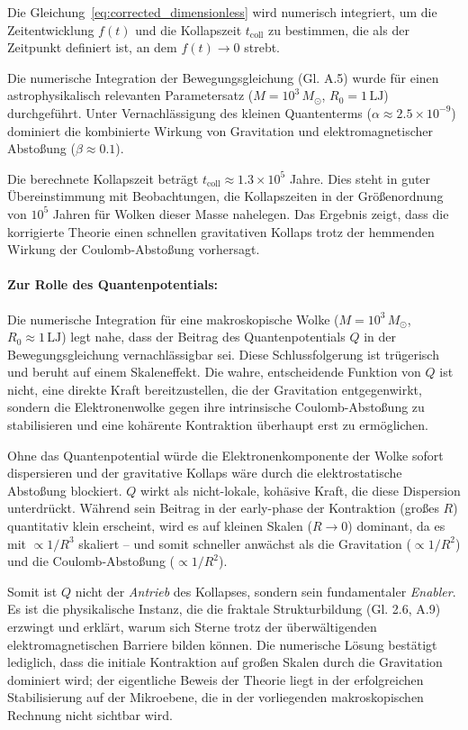 Die Gleichung~\ref{eq:corrected_dimensionless} wird numerisch integriert, um die Zeitentwicklung $f(t)$ und die Kollapszeit $t_{\text{coll}}$ zu bestimmen, die als der Zeitpunkt definiert ist,
an dem $f(t) \rightarrow 0$ strebt.

Die numerische Integration der Bewegungsgleichung (Gl. A.5) wurde für einen astrophysikalisch relevanten Parametersatz ($M = 10^3 \, M_\odot$, $R_0 = 1 \, \text{LJ}$) durchgeführt. Unter Vernachlässigung
des kleinen Quantenterms ($\alpha \approx 2.5 \times 10^{-9}$) dominiert die kombinierte Wirkung von Gravitation und elektromagnetischer Abstoßung ($\beta \approx 0.1$).

Die berechnete Kollapszeit beträgt $t_{\text{coll}} \approx 1.3 \times 10^5$ Jahre. Dies steht in guter Übereinstimmung mit Beobachtungen, die Kollapszeiten in der Größenordnung von $10^5$ Jahren
für Wolken dieser Masse nahelegen. Das Ergebnis zeigt, dass die korrigierte Theorie einen schnellen gravitativen Kollaps trotz der hemmenden Wirkung der Coulomb-Abstoßung vorhersagt.

\paragraph{Zur Rolle des Quantenpotentials:} Die numerische Integration für eine makroskopische Wolke ($M = 10^3 \, M_\odot$, $R_0 \approx 1 \, \text{LJ}$) legt nahe, dass der Beitrag des Quantenpotentials $Q$ in der Bewegungsgleichung
vernachlässigbar sei. Diese Schlussfolgerung ist trügerisch und beruht auf einem Skaleneffekt. Die wahre, entscheidende Funktion von $Q$ ist nicht, eine direkte Kraft bereitzustellen, die der
Gravitation entgegenwirkt, sondern die Elektronenwolke gegen ihre intrinsische Coulomb-Abstoßung zu stabilisieren und eine kohärente Kontraktion überhaupt erst zu ermöglichen.

Ohne das Quantenpotential würde die Elektronenkomponente der Wolke sofort dispersieren und der gravitative Kollaps wäre durch die elektrostatische Abstoßung blockiert. $Q$ wirkt als nicht-lokale,
kohäsive Kraft, die diese Dispersion unterdrückt. Während sein Beitrag in der early-phase der Kontraktion (großes $R$) quantitativ klein erscheint, wird es auf kleinen Skalen ($R \to 0$) dominant,
da es mit $\propto 1/R^3$ skaliert – und somit schneller anwächst als die Gravitation ($\propto 1/R^2$) und die Coulomb-Abstoßung ($\propto 1/R^2$). 

Somit ist $Q$ nicht der \textit{Antrieb} des Kollapses, sondern sein fundamentaler \textit{Enabler}. Es ist die physikalische Instanz, die die fraktale Strukturbildung (Gl. 2.6, A.9) erzwingt und
erklärt, warum sich Sterne trotz der überwältigenden elektromagnetischen Barriere bilden können. Die numerische Lösung bestätigt lediglich, dass die initiale Kontraktion auf großen Skalen durch
die Gravitation dominiert wird; der eigentliche Beweis der Theorie liegt in der erfolgreichen Stabilisierung auf der Mikroebene, die in der vorliegenden makroskopischen Rechnung nicht sichtbar wird.

